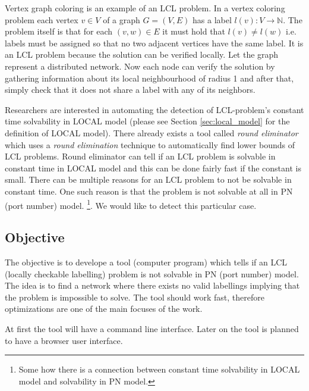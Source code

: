 Vertex graph coloring is an example of an LCL problem.
In a vertex coloring problem each vertex $v \in V$ of a graph $G = (V, E)$ has a label $l(v): V \rightarrow \mathbb{N}$.
The problem itself is that for each $(v, w) \in E$ it must hold that $l(v) \neq l(w)$ i.e. labels must be assigned so that no two adjacent vertices have the same label.
It is an LCL problem because the solution can be verified locally.
Let the graph represent a distributed network.
Now each node can verify the solution by gathering information about its local neighbourhood of radius 1 and after that, simply check that it does not share a label with any of its neighbors.

Researchers are interested in automating the detection of LCL-problem's constant time solvability in LOCAL model (please see Section \ref{sec:local_model} for the definition of LOCAL model).
There already exists a tool called \emph{round eliminator} \cite{DBLP:conf/podc/Olivetti20} which uses a \emph{round elimination} \cite{DBLP:conf/podc/Brandt19} technique to automatically find lower bounds of LCL problems.
Round eliminator can tell if an LCL problem is solvable in constant time in LOCAL model and this can be done fairly fast if the constant is small.%
There can be multiple reasons for an LCL problem to not be solvable in constant time.
One such reason is that the problem is not solvable at all in PN (port number) model.
\footnote{Some how there is a connection between constant time solvability in LOCAL model and solvability in PN model.}.
We would like to detect this particular case.


\subsection{Objective} %
The objective is to develope a tool (computer program) which tells if an LCL (locally checkable labelling) problem is not solvable in PN (port number) model.
The idea is to find a network where there exists no valid labellings implying that the problem is impossible to solve.
The tool should work fast, therefore optimizations are one of the main focuses of the work.

At first the tool will have a command line interface.
Later on the tool is planned to have a browser user interface.


